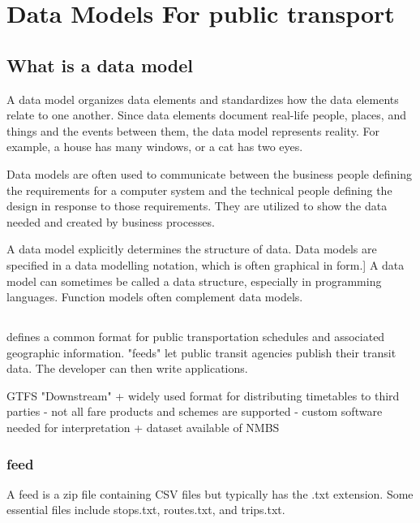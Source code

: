 \section{Data Models For public transport}\label{section:data_model_rel_work}

\subsection{What is a data model }
A data model organizes data elements and standardizes how the data elements relate to one another. Since data elements document real-life people, places, and things and the events between them, the data model represents reality. For example, a house has many windows, or a cat has two eyes.

Data models are often used to communicate between the business people defining the requirements for a computer system and the technical people defining the design in response to those requirements. They are utilized to show the data needed and created by business processes.
 
A data model explicitly determines the structure of data. Data models are specified in a data modelling notation, which is often graphical in form.]
A data model can sometimes be called a data structure, especially in programming languages. Function models often complement data models.
\subsection{}
 defines a common format for public transportation schedules and associated geographic information. "feeds" let public transit agencies publish their transit data. The developer can then write applications.

GTFS
"Downstream" 
+ widely used format for distributing timetables to third
  parties
- not all fare products and schemes are supported
- custom software needed for interpretation 
+ dataset available of NMBS

\subsubsection{ feed}
A feed is a zip file containing CSV files but typically has the .txt extension. Some essential files include stops.txt, routes.txt, and trips.txt.


